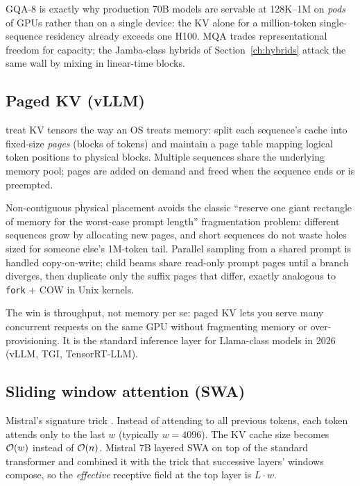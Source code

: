 \noindent
GQA-8 is exactly why production 70B models are servable at 128K--1M on
\emph{pods} of GPUs rather than on a single device: the KV alone for a
million-token single-sequence residency already exceeds one H100. MQA
trades representational freedom for capacity; the Jamba-class hybrids of
Section~\ref{ch:hybrids} attack the same wall by mixing in linear-time
blocks.

\subsection{Paged KV (vLLM)}

\citet{kwon2023vllm} treat KV tensors the way an OS treats memory: split
each sequence's cache into fixed-size \emph{pages} (blocks of tokens) and
maintain a page table mapping logical token positions to physical blocks.
Multiple sequences share the underlying memory pool; pages are added on
demand and freed when the sequence ends or is preempted.

Non-contiguous physical placement avoids the classic ``reserve one giant
rectangle of memory for the worst-case prompt length'' fragmentation
problem: different sequences grow by allocating new pages, and short
sequences do not waste holes sized for someone else's 1M-token tail.
Parallel sampling from a shared prompt is handled copy-on-write; child
beams share read-only prompt pages until a branch diverges, then duplicate
only the suffix pages that differ, exactly analogous to \texttt{fork} +
COW in Unix kernels.

The win is throughput, not memory per se: paged KV lets you serve many
concurrent requests on the same GPU without fragmenting memory or
over-provisioning. It is the standard inference layer for Llama-class
models in 2026 (vLLM, TGI, TensorRT-LLM).

\subsection{Sliding window attention (SWA)}

Mistral's signature trick \citep{jiang2023mistral7b}. Instead of attending
to all previous tokens, each token attends only to the last \(w\) (typically
\(w = 4096\)). The KV cache size becomes \(\mathcal{O}(w)\) instead of \(\mathcal{O}(n)\).
Mistral 7B layered SWA on top of the standard transformer and combined it
with the trick that successive layers' windows compose, so the
\emph{effective} receptive field at the top layer is
\(L \cdot w\).

